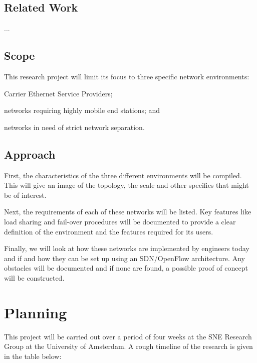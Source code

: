 \documentclass[oneside,twocolumn,7pt,a4paper]{article}
\begin{document}
		\subsection*{Related Work} %
		\label{sub:related_work}
		...
		
		\subsection*{Scope} %
		\label{sub:scope}
		This research project will limit its focus to three specific network environments:
			\begin{inparaenum}[ 1)]
				\item Carrier Ethernet Service Providers;
				\item networks requiring highly mobile end stations; and
				\item networks in need of strict network separation.
			\end{inparaenum}
		
		\subsection*{Approach} %
		\label{sub:approach}
		First, the characteristics of the three different environments will be compiled. This will give an image of the topology, the scale and other specifics that might be of interest.
		
		Next, the requirements of each of these networks will be listed. Key features like load sharing and fail-over procedures will be documented to provide a clear definition of the environment and the features required for its users.
		
		Finally, we will look at how these networks are implemented by engineers today and if and how they can be set up using an SDN/OpenFlow architecture. Any obstacles will be documented and if none are found, a possible proof of concept will be constructed.



	
	\section{Planning} %
	\label{sec:planning}
		This project will be carried out over a period of four weeks at the SNE Research Group at the University of Amsterdam. A rough timeline of the research is given in the table below: \\
		
\end{document}
